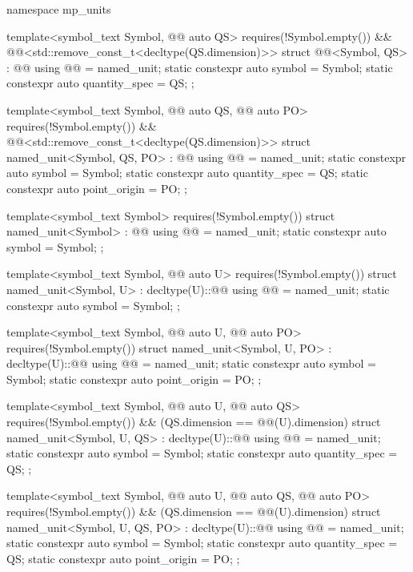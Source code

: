 \begin{codeblock}
namespace mp_units {

template<symbol_text Symbol, @@ auto QS>
  requires(!Symbol.empty()) && @@<std::remove_const_t<decltype(QS.dimension)>>
struct @@<Symbol, QS> : @@ {
  using @@ = named_unit;
  static constexpr auto symbol = Symbol;
  static constexpr auto quantity_spec = QS;
};

template<symbol_text Symbol, @@ auto QS, @@ auto PO>
  requires(!Symbol.empty()) && @@<std::remove_const_t<decltype(QS.dimension)>>
struct named_unit<Symbol, QS, PO> : @@ {
  using @@ = named_unit;
  static constexpr auto symbol = Symbol;
  static constexpr auto quantity_spec = QS;
  static constexpr auto point_origin = PO;
};

template<symbol_text Symbol>
  requires(!Symbol.empty())
struct named_unit<Symbol> : @@ {
  using @@ = named_unit;
  static constexpr auto symbol = Symbol;
};

template<symbol_text Symbol, @@ auto U>
  requires(!Symbol.empty())
struct named_unit<Symbol, U> : decltype(U)::@@ {
  using @@ = named_unit;
  static constexpr auto symbol = Symbol;
};

template<symbol_text Symbol, @@ auto U, @@ auto PO>
  requires(!Symbol.empty())
struct named_unit<Symbol, U, PO> : decltype(U)::@@ {
  using @@ = named_unit;
  static constexpr auto symbol = Symbol;
  static constexpr auto point_origin = PO;
};

template<symbol_text Symbol, @@ auto U, @@ auto QS>
  requires(!Symbol.empty()) && (QS.dimension == @@(U).dimension)
struct named_unit<Symbol, U, QS> : decltype(U)::@@ {
  using @@ = named_unit;
  static constexpr auto symbol = Symbol;
  static constexpr auto quantity_spec = QS;
};

template<symbol_text Symbol, @@ auto U, @@ auto QS,
         @@ auto PO>
  requires(!Symbol.empty()) && (QS.dimension == @@(U).dimension)
struct named_unit<Symbol, U, QS, PO> : decltype(U)::@@ {
  using @@ = named_unit;
  static constexpr auto symbol = Symbol;
  static constexpr auto quantity_spec = QS;
  static constexpr auto point_origin = PO;
};

}
\end{codeblock}

